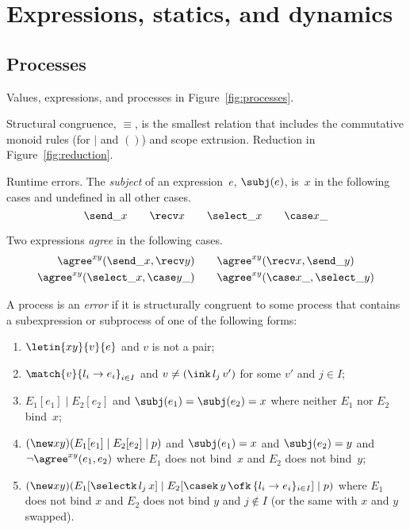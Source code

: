 \section{Expressions, statics, and dynamics}
\label{sec:definitions}

\subsection{Processes}
\label{sec:processes}



Values, expressions, and processes in Figure~\ref{fig:processes}.



Structural congruence, $\equiv$, is the smallest relation that
includes the commutative monoid rules (for $\mid$ and $()$) and scope
extrusion. Reduction in Figure~\ref{fig:reduction}.


Runtime errors. The \emph{subject} of an expression~$e$, $\subj(e)$,
is~$x$ in the following cases and undefined in all other cases.
%
\begin{equation*}
  \send \_x \qquad
  \recv x \qquad
  \select \_x \qquad
  \case x\_
\end{equation*}

Two expressions \emph{agree} in the following cases.
%
\begin{align*}
  \agree^{xy}(\send \_x, \recv y) &\qquad
  \agree^{xy}(\recv x,\send \_y)\\
  \agree^{xy}(\select \_x, \case y\_) &\qquad
  \agree^{xy}(\case x\_,\select \_y)
\end{align*}

A process is an \emph{error} if it is structurally congruent to some
process that contains a subexpression or subprocess of one of the
following forms:
%
\begin{enumerate}
\item $\letin{xy}{v}{e}$ and $v$ is not a pair;
\item $\match{v}{l_i\rightarrow e_i}_{i\in I}$ and $v\ne(\ink\,l_j\,v')$ for some $v'$ and
  $j\in I$;
\item $E_1[e_1] \mid E_2[e_2]$ and $\subj(e_1) = \subj(e_2) = x$ where
  neither $E_1$ nor $E_2$ bind~$x$;
\item $(\new xy)(E_1[e_1] \mid E_2[e_2] \mid p)$ and $\subj(e_1)=x$
  and $\subj(e_2)=y$ and $\neg\agree^{xy}(e_1,e_2)$ where $E_1$ does not
  bind~$x$ and $E_2$ does not bind~$y$;
\item $  (\new xy)(E_1[\selectk\,l_j\,x] \mid
  E_2[\casek\,y\,\ofk\,\{l_i\rightarrow e_i\}_{i\in I}] \mid p) $
  where $E_1$ does not bind $x$ and $E_2$ does not bind $y$ and
  $j\notin I$ (or the same with $x$ and $y$ swapped).
\end{enumerate}

